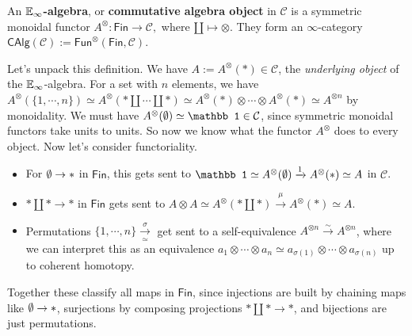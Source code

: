    \begin{definition}[]
       An $\mathbb{E}_{\infty}$\textbf{-algebra}, or \textbf{commutative algebra object} in $\mathcal{C} $ is a symmetric monoidal functor $A^{\otimes }\colon  \mathsf{Fin}  \to \mathcal{C},$ where $\amalg \mapsto  \otimes $. They form an $\infty$-category $\mathsf{CAlg} (\mathcal{C} ):= \mathsf{Fun} ^{\otimes}(\mathsf{Fin} ,\mathcal{C} )$.
   \end{definition}
   Let's unpack this definition. We have $A:= A^{\otimes}(*) \in \mathcal{C} $, the \emph{underlying object} of the $\mathbb{E}_{\infty}$-algebra. For a set with $n$ elements, we have $A^{\otimes}(\{1,\cdots ,n\} )\simeq  A^{\otimes}(*\amalg \cdots \amalg *) \simeq A^{\otimes}(*)\otimes \cdots \otimes A^{\otimes}(*) \simeq A^{\otimes n}$ by monoidality. We must have $A^{\otimes}(\O) \simeq  \mathbb 1 \in \mathcal{C} $, since symmetric monoidal functors take units to units. So now we know what the functor $A^{\otimes}$ does to every object. Now let's consider functoriality.
   \begin{itemize}
   \setlength\itemsep{-.2em}
       \item For $\emptyset \to  *$ in $\mathsf{Fin} $, this gets sent to $\mathbb 1 \simeq  A^{\otimes}(\O) \xrightarrow{1} A^{\otimes}(*) \simeq A$ in $\mathcal{C} $.
       \item $*\amalg * \to  *$ in $\mathsf{Fin} $ gets sent to $A\otimes A \simeq A^{\otimes}(*\amalg *) \xrightarrow{\mu} A^{\otimes }(*) \simeq A$.
       \item Permutations $\{1,\cdots ,n\} \underset{\simeq }{\xrightarrow{\sigma} } $ get sent to a self-equivalence $A^{\otimes n}\xrightarrow{\sim} A^{\otimes n}$, where we can interpret this as an equivalence $a_1 \otimes \cdots \otimes a_n  \simeq a_{\sigma(1)}\otimes \cdots \otimes a_{\sigma(n)}$ up to coherent homotopy.
   \end{itemize}
   Together these classify all maps in $\mathsf{Fin} $, since injections are built by chaining maps like $\emptyset \to *$, surjections by composing projections $*\amalg * \to *$, and bijections are just permutations.


